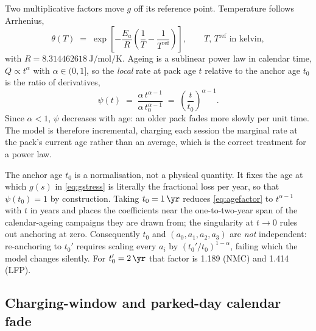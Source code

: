\documentclass[11pt,a4paper]{article}
\begin{document}
Two multiplicative factors move $g$ off its reference point. Temperature
follows Arrhenius,
%
\begin{equation}
\theta(T) \;=\; \exp\!\left[-\frac{E_a}{R}
  \left(\frac{1}{T} - \frac{1}{T^{\mathrm{ref}}}\right)\right],
\qquad T,\,T^{\mathrm{ref}} \text{ in kelvin},
\label{eq:arrhenius}
\end{equation}
%
with $R = \SI{8.314462618}{\joule\per\mole\per\kelvin}$. Ageing is a
sublinear power law in calendar time, $Q \propto t^{\alpha}$ with
$\alpha \in (0,1]$, so the \emph{local} rate at pack age $t$ relative to
the anchor age $t_{0}$ is the ratio of derivatives,
%
\begin{equation}
\psi(t) \;=\;
  \frac{\alpha\, t^{\alpha-1}}{\alpha\, t_{0}^{\alpha-1}}
  \;=\; \left(\frac{t}{t_{0}}\right)^{\alpha-1}.
\label{eq:agefactor}
\end{equation}
%
Since $\alpha < 1$, $\psi$ decreases with age: an older pack fades more
slowly per unit time. The model is therefore incremental, charging each
session the marginal rate at the pack's current age rather than an
average, which is the correct treatment for a power law.

The anchor age $t_{0}$ is a normalisation, not a physical quantity. It
fixes the age at which $g(s)$ in \eqref{eq:gstress} is literally the
fractional loss per year, so that $\psi(t_{0}) = 1$ by construction.
Taking $t_{0} = \SI{1}{\yr}$ reduces \eqref{eq:agefactor} to
$t^{\alpha-1}$ with $t$ in years and places the coefficients near the
one-to-two-year span of the calendar-ageing campaigns they are drawn
from; the singularity at $t\to 0$ rules out anchoring at zero.
Consequently $t_{0}$ and $(a_0,a_1,a_2,a_3)$ are \emph{not} independent:
re-anchoring to $t_0'$ requires scaling every $a_i$ by
$(t_0'/t_{0})^{1-\alpha}$, failing which the model changes silently.
For $t_0' = \SI{2}{\yr}$ that factor is \num{1.189} (NMC) and
\num{1.414} (LFP).

\subsection{Charging-window and parked-day calendar fade}
\end{document}
